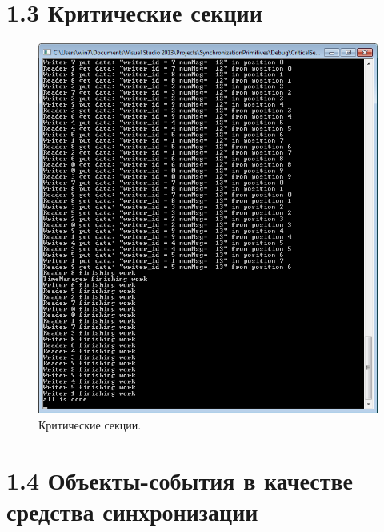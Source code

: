 \documentclass[a4paper,12pt]{article} %
\begin{document}
\newpage

\section*{1.3 Критические секции}

\begin{figure}[h!]
\centering
\includegraphics[scale=1]{res/003}
\caption{Критические секции.}
\end{figure}

\newpage

\section*{1.4 Объекты-события в качестве средства синхронизации}
\end{document}
